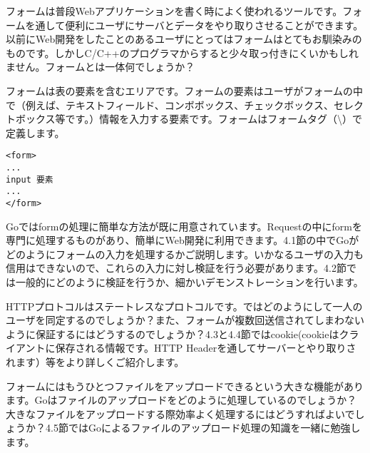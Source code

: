 フォームは普段Webアプリケーションを書く時によく使われるツールです。フォームを通して便利にユーザにサーバとデータをやり取りさせることができます。以前にWeb開発をしたことのあるユーザにとってはフォームはとてもお馴染みのものです。しかしC/C++のプログラマからすると少々取っ付きにくいかもしれません。フォームとは一体何でしょうか？

フォームは表の要素を含むエリアです。フォームの要素はユーザがフォームの中で（例えば、テキストフィールド、コンボボックス、チェックボックス、セレクトボックス等です。）情報を入力する要素です。フォームはフォームタグ（\textbackslash）で定義します。

\begin{lstlisting}[numbers=none]
<form>
...
input 要素
...
</form>
\end{lstlisting}

Goではformの処理に簡単な方法が既に用意されています。Requestの中にformを専門に処理するものがあり、簡単にWeb開発に利用できます。4.1節の中でGoがどのようにフォームの入力を処理するかご説明します。いかなるユーザの入力も信用はできないので、これらの入力に対し検証を行う必要があります。4.2節では一般的にどのように検証を行うか、細かいデモンストレーションを行います。

HTTPプロトコルはステートレスなプロトコルです。ではどのようにして一人のユーザを同定するのでしょうか？また、フォームが複数回送信されてしまわないように保証するにはどうするのでしょうか？4.3と4.4節ではcookie(cookieはクライアントに保存される情報です。HTTP Headerを通してサーバーとやり取りされます）等をより詳しくご紹介します。

フォームにはもうひとつファイルをアップロードできるという大きな機能があります。Goはファイルのアップロードをどのように処理しているのでしょうか？大きなファイルをアップロードする際効率よく処理するにはどうすればよいでしょうか？4.5節ではGoによるファイルのアップロード処理の知識を一緒に勉強します。

